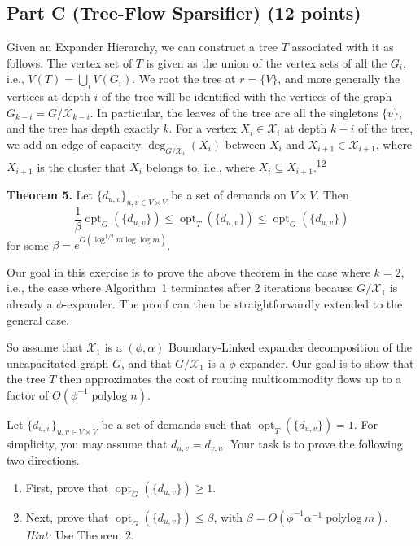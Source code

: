 \documentclass[a4paper,11pt]{article}
\DeclareMathOperator{\opt}{opt}
\DeclareMathOperator{\polylog}{polylog}
\DeclareMathOperator{\degG}{deg}
\renewcommand{\deg}{\degG} %
\begin{document}
\subsection*{Part C (Tree-Flow Sparsifier) (12 points)}
Given an Expander Hierarchy, we can construct a tree \(T\) associated with it as follows. The vertex set of \(T\) is given as the union of the vertex sets of all the \(G_i\), i.e., \(V(T) = \bigcup_i V(G_i)\). We root the tree at \(r = \{V\}\), and more generally the vertices at depth \(i\) of the tree will be identified with the vertices of the graph \(G_{k-i} = G / \mathcal{X}_{k-i}\). In particular, the leaves of the tree are all the singletons \(\{v\}\), and the tree has depth exactly \(k\). For a vertex \(X_i \in \mathcal{X}_i\) at depth \(k-i\) of the tree, we add an edge of capacity \(\deg_{G / \mathcal{X}_i}(X_i)\) between \(X_i\) and \(X_{i+1} \in \mathcal{X}_{i+1}\), where \(X_{i+1}\) is the cluster that \(X_i\) belongs to, i.e., where \(X_i \subseteq X_{i+1}\).\textsuperscript{12}

\textbf{Theorem 5.} Let \(\{d_{u,v}\}_{u,v\in V\times V}\) be a set of demands on \(V\times V\). Then
\[
\frac{1}{\beta}\opt_G(\{d_{u,v}\})\leq \opt_T(\{d_{u,v}\})\leq \opt_G(\{d_{u,v}\})
\]
for some \(\beta = e^{O(\log^{1/2} m \log \log m)}\).

Our goal in this exercise is to prove the above theorem in the case where \(k = 2\), i.e., the case where Algorithm~1 terminates after 2 iterations because \(G / \mathcal{X}_1\) is already a \(\phi\)-expander. The proof can then be straightforwardly extended to the general case.

So assume that \(\mathcal{X}_1\) is a \((\phi,\alpha)\) Boundary-Linked expander decomposition of the uncapacitated graph \(G\), and that \(G / \mathcal{X}_1\) is a \(\phi\)-expander. Our goal is to show that the tree \(T\) then approximates the cost of routing multicommodity flows up to a factor of \(O(\phi^{-1}\polylog n)\).

Let \(\{d_{u,v}\}_{u,v\in V\times V}\) be a set of demands such that \(\opt_T(\{d_{u,v}\}) = 1\). For simplicity, you may assume that \(d_{u,v} = d_{v,u}\). Your task is to prove the following two directions.

\begin{enumerate}
    \item First, prove that \(\opt_G(\{d_{u,v}\})\geq 1\).
    \item Next, prove that \(\opt_G(\{d_{u,v}\})\leq \beta\), with \(\beta = O(\phi^{-1}\alpha^{-1}\polylog m)\). \textit{Hint:} Use Theorem 2.
\end{enumerate}
\end{document}
